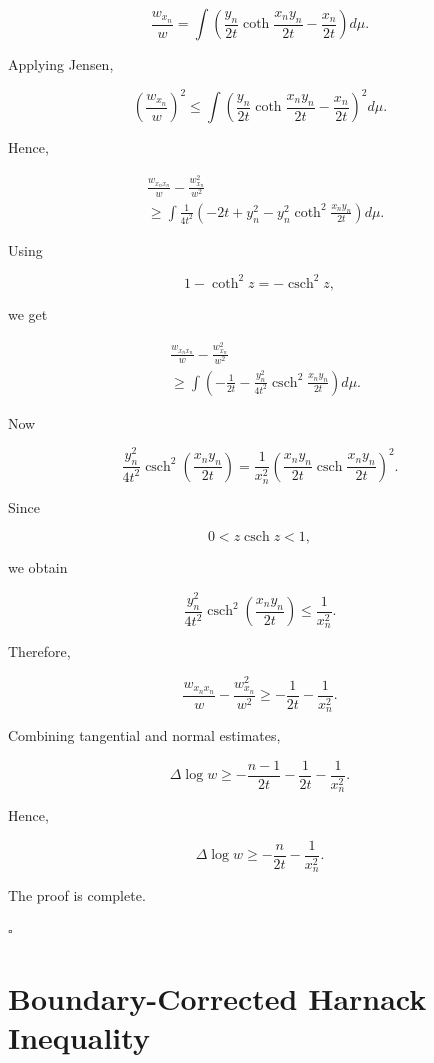 \documentclass[11pt]{amsart}
\DeclareMathOperator{\csch}{csch}
\theoremstyle{definition}
\theoremstyle{remark}
\begin{document}
\[
\frac{w_{x_n}}w
=
\int
\left(
\frac{y_n}{2t}
\coth
\frac{x_ny_n}{2t}
-
\frac{x_n}{2t}
\right)
d\mu .
\]


Applying Jensen,

\[
\left(\frac{w_{x_n}}w\right)^2
\leq
\int
\left(
\frac{y_n}{2t}
\coth
\frac{x_ny_n}{2t}
-
\frac{x_n}{2t}
\right)^2
d\mu .
\]


Hence,

\[
\begin{aligned}
&
\frac{w_{x_nx_n}}w
-
\frac{w_{x_n}^2}{w^2}
\\
&\geq
\int
\frac1{4t^2}
\left(
-2t
+
y_n^2
-
y_n^2
\coth^2
\frac{x_ny_n}{2t}
\right)
d\mu .
\end{aligned}
\]


Using

\[
1-\coth^2 z
=
-\csch^2 z ,
\]

we get

\[
\begin{aligned}
&
\frac{w_{x_nx_n}}w
-
\frac{w_{x_n}^2}{w^2}
\\
&\geq
\int
\left(
-\frac1{2t}
-
\frac{y_n^2}{4t^2}
\csch^2
\frac{x_ny_n}{2t}
\right)d\mu .
\end{aligned}
\]

Now

\[
\frac{y_n^2}{4t^2}
\csch^2
\left(
\frac{x_ny_n}{2t}
\right)
=
\frac1{x_n^2}
\left(
\frac{x_ny_n}{2t}
\csch
\frac{x_ny_n}{2t}
\right)^2 .
\]


Since

\[
0<z\csch z<1,
\]

we obtain

\[
\frac{y_n^2}{4t^2}
\csch^2
\left(
\frac{x_ny_n}{2t}
\right)
\leq
\frac1{x_n^2}.
\]


Therefore,

\[
\frac{w_{x_nx_n}}w
-
\frac{w_{x_n}^2}{w^2}
\geq
-\frac1{2t}
-\frac1{x_n^2}.
\]


Combining tangential and normal estimates,

\[
\Delta\log w
\geq
-\frac{n-1}{2t}
-\frac1{2t}
-\frac1{x_n^2}.
\]

Hence,

\[
\boxed{
\Delta\log w
\geq
-\frac n{2t}
-\frac1{x_n^2}
}.
\]

The proof is complete.

\hfill$\square$


\section{Boundary-Corrected Harnack Inequality}
\end{document}
